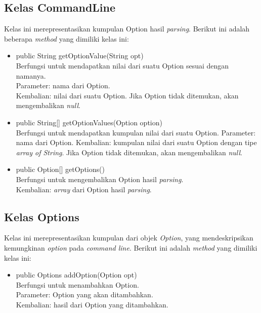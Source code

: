 \subsection{Kelas CommandLine}
\label{subsec:commandline}
Kelas ini merepresentasikan kumpulan Option hasil \textit{parsing}.
Berikut ini adalah beberapa \textit{method} yang dimiliki kelas ini: 
\begin{itemize}
\item public String getOptionValue(String opt)\\
Berfungsi untuk mendapatkan nilai dari suatu Option sesuai dengan namanya.\\
Parameter: nama dari Option.\\
Kembalian: nilai dari suatu Option. Jika Option tidak ditemukan, akan mengembalikan \textit{null}.
\item public String[] getOptionValues(Option option)\\
Berfungsi untuk mendapatkan kumpulan nilai dari suatu Option.
Parameter: nama dari Option.
Kembalian: kumpulan nilai dari suatu Option dengan tipe \textit{array of String}. Jika Option tidak ditemukan, akan mengembalikan \textit{null}.
\item public Option[] getOptions()\\
Berfungsi untuk mengembalikan Option hasil \textit{parsing}.\\ 
Kembalian: \textit{array} dari Option hasil \textit{parsing}.


\end{itemize}

\subsection{Kelas Options}
\label{subsec:options}
Kelas ini merepresentasikan kumpulan dari objek \textit{Option}, yang mendeskripsikan kemungkinan \textit{option} pada \textit{command line}. Berikut ini adalah \textit{method} yang dimiliki kelas ini: 
\begin{itemize}
\item public Options addOption(Option opt)\\
Berfungsi untuk menambahkan Option.\\
Parameter: Option yang akan ditambahkan.\\
Kembalian: hasil dari Option yang ditambahkan.

\end{itemize}


